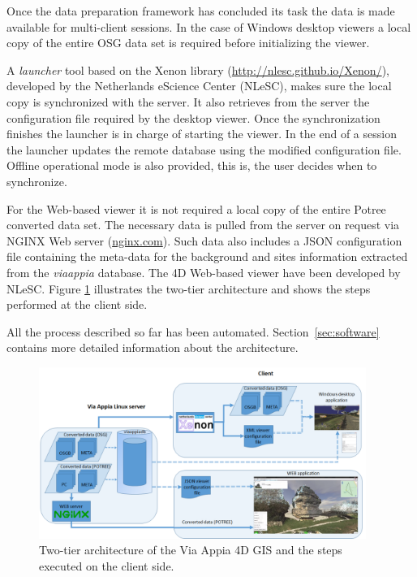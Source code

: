 Once the data preparation framework has concluded its task the data is made available
for multi-client sessions. In the case of Windows desktop viewers a local copy of the
entire OSG data set is required before initializing the viewer.

A \textit{launcher} tool based on the Xenon library (\url{http://nlesc.github.io/Xenon/}),
developed by the Netherlands eScience Center (NLeSC), makes sure the local copy is
synchronized with the server. It also retrieves from the server the configuration
file required by the desktop viewer. Once the synchronization finishes the launcher
is in charge of starting the viewer. In the end of a session the launcher updates
the remote database using the modified configuration file. Offline operational
mode is also provided, this is, the user decides when to synchronize.

For the Web-based viewer it is not required a local copy of the entire Potree converted
data set. The necessary data is pulled from the server on request via NGINX Web server
(\url{nginx.com}). Such data also includes a JSON configuration file containing the
meta-data for the background and sites information extracted from the {\em viaappia}
database. The 4D Web-based viewer have been developed by NLeSC. Figure \ref{fig:sys_arch_2tier}
illustrates the two-tier architecture and shows the steps performed at the client
side. 

All the process described so far has been automated. Section~\ref{sec:software} contains
more detailed information about the architecture. 

\begin{figure}[H] \centering
\includegraphics[width=0.95\textwidth]{fig/system_architecture/TwoTierArchitecture.pdf}
\caption{Two-tier architecture of the Via Appia 4D GIS and the steps
executed on the client side.} \label{fig:sys_arch_2tier} \end{figure}
